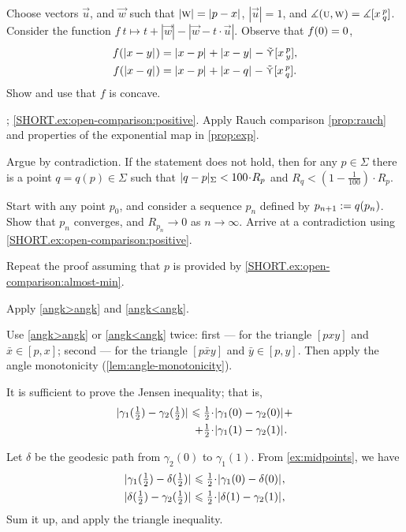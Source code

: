 \begin{multicols}{2}
Choose vectors $\vec u$, and $\vec w$ 
such that $|\vec w|\z=\dist{p}{x}{}$, $|\vec u|=1$, and $\measuredangle(\text{\sc{u}},\text{\sc{w}})=\measuredangle[x\,{}^{p}_{q}]$.
Consider the function
$f\:t\mapsto t+|\vec w|-|\vec w-t\cdot \vec u|$.
Observe that $f(0)\z=0$,
\begin{align*}
f(\dist{x}{y}{})&=\dist{x}{p}{}+\dist{x}{y}{}-\side\hinge xpy,
\\
f(\dist{x}{q}{})&=\dist{x}{p}{}+\dist{x}{q}{}-\side\hinge xpq.
\end{align*}
Show and use that $f$ is concave.

\parbf{\ref{ex:open-comparison}}; \ref{SHORT.ex:open-comparison:positive}.
Apply Rauch comparison \ref{prop:rauch} and properties of the exponential map in \ref{prop:exp}.

 Argue by contradiction.
If the statement does not hold, then for any $p\in\Sigma$ there is a point $q=q(p)\in \Sigma$ such that 
$\dist{q}{p}\Sigma< 100\cdot R_p$
and
$R_q<(1-\tfrac1{100})\cdot R_p$.

Start with any point $p_0$, and consider a sequence $p_n$ defined by $p_{n+1}\z\df q(p_n)$.
Show that $p_n$ converges, and $R_{p_n}\to 0$ as $n\to\infty$.
Arrive at a contradiction using \ref{SHORT.ex:open-comparison:positive}.

 Repeat the proof assuming that $p$ is provided by \ref{SHORT.ex:open-comparison:almost-min}.

Apply \ref{angk>angk} and \ref{angk<angk}.

 Use \ref{angk>angk} or \ref{angk<angk} twice:
first --- for the triangle $[pxy]$ and $\bar x\in [p,x]$;
second --- for the triangle $[p\bar xy]$ and $\bar y\in [p,y]$.
Then apply the angle monotonicity (\ref{lem:angle-monotonicity}).

It is sufficient to prove the Jensen inequality;
that is, 
\begin{align*}
\dist{\gamma_1(\tfrac12)}{\gamma_2(\tfrac12)}{}
\le
\tfrac12\cdot&\dist{\gamma_1(0)}{\gamma_2(0)}{}
+
\\
+
\tfrac12\cdot&\dist{\gamma_1(1)}{\gamma_2(1)}{}.
\end{align*}

Let $\delta$ be the geodesic path from $\gamma_2(0)$ to $\gamma_1(1)$.
From \ref{ex:midpoints}, we have
\begin{align*}
\dist{\gamma_1(\tfrac12)}{\delta(\tfrac12)}{}
&\le
\tfrac12\cdot\dist{\gamma_1(0)}{\delta(0)}{},
\\
\dist{\delta(\tfrac12)}{\gamma_2(\tfrac12)}{}
&\le
\tfrac12\cdot\dist{\delta(1)}{\gamma_2(1)}{},
\end{align*}
Sum it up, and apply the triangle inequality.


\end{multicols}
